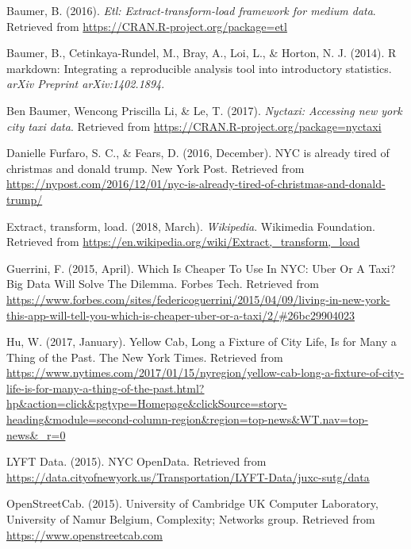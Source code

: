 \documentclass[12pt,twoside]{reedthesis}
\theoremstyle{definition}
\theoremstyle{definition}
\theoremstyle{definition}
\theoremstyle{remark}
\begin{document}

\noindent

\setlength{\parindent}{-0.20in} \setlength{\leftskip}{0.20in}
\setlength{\parskip}{8pt}

\hypertarget{refs}{}
\hypertarget{ref-pkgetl}{}
Baumer, B. (2016). \emph{Etl: Extract-transform-load framework for
medium data}. Retrieved from
\url{https://CRAN.R-project.org/package=etl}

\hypertarget{ref-baumer2014}{}
Baumer, B., Cetinkaya-Rundel, M., Bray, A., Loi, L., \& Horton, N. J.
(2014). R markdown: Integrating a reproducible analysis tool into
introductory statistics. \emph{arXiv Preprint arXiv:1402.1894}.

\hypertarget{ref-pkgnyctaxi}{}
Ben Baumer, Wencong Priscilla Li, \& Le, T. (2017). \emph{Nyctaxi:
Accessing new york city taxi data}. Retrieved from
\url{https://CRAN.R-project.org/package=nyctaxi}

\hypertarget{ref-furfaro2016}{}
Danielle Furfaro, S. C., \& Fears, D. (2016, December). NYC is already
tired of christmas and donald trump. New York Post. Retrieved from
\url{https://nypost.com/2016/12/01/nyc-is-already-tired-of-christmas-and-donald-trump/}

\hypertarget{ref-wikipedia}{}
Extract, transform, load. (2018, March). \emph{Wikipedia}. Wikimedia
Foundation. Retrieved from
\url{https://en.wikipedia.org/wiki/Extract,_transform,_load}

\hypertarget{ref-guerrini2015}{}
Guerrini, F. (2015, April). Which Is Cheaper To Use In NYC: Uber Or A
Taxi? Big Data Will Solve The Dilemma. Forbes Tech. Retrieved from
\url{https://www.forbes.com/sites/federicoguerrini/2015/04/09/living-in-new-york-this-app-will-tell-you-which-is-cheaper-uber-or-a-taxi/2/\#26bc29904023}

\hypertarget{ref-hu2017}{}
Hu, W. (2017, January). Yellow Cab, Long a Fixture of City Life, Is for
Many a Thing of the Past. The New York Times. Retrieved from
\url{https://www.nytimes.com/2017/01/15/nyregion/yellow-cab-long-a-fixture-of-city-life-is-for-many-a-thing-of-the-past.html?hp\&action=click\&pgtype=Homepage\&clickSource=story-heading\&module=second-column-region\&region=top-news\&WT.nav=top-news\&_r=0}

\hypertarget{ref-datalyft}{}
LYFT Data. (2015). NYC OpenData. Retrieved from
\url{https://data.cityofnewyork.us/Transportation/LYFT-Data/juxc-sutg/data}

\hypertarget{ref-appone}{}
OpenStreetCab. (2015). University of Cambridge UK Computer Laboratory,
University of Namur Belgium, Complexity; Networks group. Retrieved from
\url{https://www.openstreetcab.com}
\end{document}
